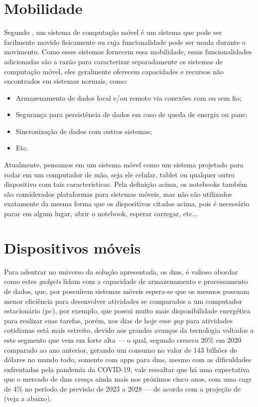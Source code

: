 \section{Mobilidade}\label{sec:mobilidade}
Segundo \citet{b2004mobile}, um sistema de computação móvel é um sistema que pode ser facilmente movido fisicamente ou cuja funcionalidade pode ser usada durante o movimento. Como esses sistemas fornecem essa mobilidade, essas funcionalidades adicionadas são a razão para caracterizar separadamente os sistemas de computação móvel, eles geralmente oferecem capacidades e recursos não encontrados em sistemas normais, como: 
 \begin{itemize}
   \item Armazenamento de dados local e/ou remoto via conexões com ou sem fio;
   \item Segurança para persistência de dados em caso de queda de energia ou pane;
   \item Sincronização de dados com outros sistemas;
   \item Etc.
 \end{itemize}

Atualmente, pensamos em um sistema móvel como um sistema projetado para rodar em um computador de mão, seja ele celular, tablet ou qualquer outro dispositivo com tais características. Pela definição acima, os notebooks também são considerados plataformas para sistemas móveis, mas não são utilizados exatamente da mesma forma que os dispositivos citados acima, pois é necessário parar em algum lugar, abrir o notebook, esperar carregar, etc...

\section{Dispositivos móveis}\label{sec:dm}
Para adentrar no universo da solução apresentada, os \acp{dm}, é valioso abordar como estes \textit{gadgets} lidam com a capacidade de armazenamento e processamento de dados, que, por possuírem sistemas móveis espera-se que os mesmos possuam menor eficiência para desenvolver atividades se comparados a um computador estacionário (\ac{pc}), por exemplo, que possui muito mais disponibilidade energética para realizar suas tarefas, porém, nos dias de hoje esse \textit{gap} para atividades cotidianas está mais estreito, devido aos grandes avanços da tecnologia voltados a este segmento que vem em forte alta — o qual, segundo \citet{data.ai} cresceu 20\% em 2020 comparado ao ano anterior, gerando um consumo no valor de 143 bilhões de dólares no mundo todo, somente com \acp{app} para \acp{dm}, mesmo com as dificuldades enfrentadas pela pandemia da COVID-19, vale ressaltar que há uma expectativa que o mercado de \acp{dm} cresça ainda mais nos próximos cinco anos, com uma \ac{cagr} de 4\% no período de previsão de 2023 a 2028 — de acordo com a projeção de \cite{intelligence_2023} (veja a  abaixo). 

